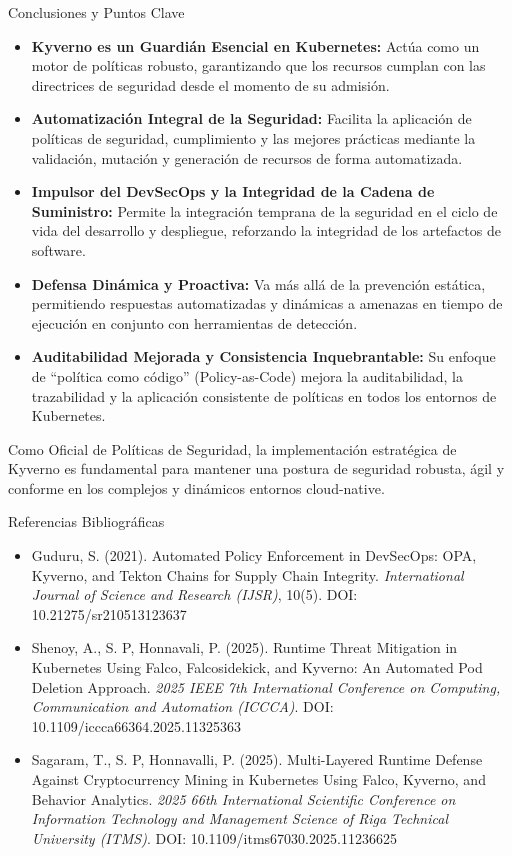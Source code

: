 \documentclass[aspectratio=169]{beamer}
\begin{document}
\begin{frame}{Conclusiones y Puntos Clave}


\begin{itemize}
  \item \textbf{Kyverno es un Guardián Esencial en Kubernetes:} Actúa como un motor de políticas robusto, garantizando que los recursos cumplan con las directrices de seguridad desde el momento de su admisión.
  \item \textbf{Automatización Integral de la Seguridad:} Facilita la aplicación de políticas de seguridad, cumplimiento y las mejores prácticas mediante la validación, mutación y generación de recursos de forma automatizada.
  \item \textbf{Impulsor del DevSecOps y la Integridad de la Cadena de Suministro:} Permite la integración temprana de la seguridad en el ciclo de vida del desarrollo y despliegue, reforzando la integridad de los artefactos de software.
  \item \textbf{Defensa Dinámica y Proactiva:} Va más allá de la prevención estática, permitiendo respuestas automatizadas y dinámicas a amenazas en tiempo de ejecución en conjunto con herramientas de detección.
  \item \textbf{Auditabilidad Mejorada y Consistencia Inquebrantable:} Su enfoque de ``política como código'' (Policy-as-Code) mejora la auditabilidad, la trazabilidad y la aplicación consistente de políticas en todos los entornos de Kubernetes.
\end{itemize}
Como Oficial de Políticas de Seguridad, la implementación estratégica de Kyverno es fundamental para mantener una postura de seguridad robusta, ágil y conforme en los complejos y dinámicos entornos cloud-native.

\end{frame}

\begin{frame}{Referencias Bibliográficas}


\begin{itemize}
  \item Guduru, S. (2021). Automated Policy Enforcement in DevSecOps: OPA, Kyverno, and Tekton Chains for Supply Chain Integrity. \textit{International Journal of Science and Research (IJSR)}, 10(5). DOI: 10.21275/sr210513123637
  \item Shenoy, A., S. P, Honnavali, P. (2025). Runtime Threat Mitigation in Kubernetes Using Falco, Falcosidekick, and Kyverno: An Automated Pod Deletion Approach. \textit{2025 IEEE 7th International Conference on Computing, Communication and Automation (ICCCA)}. DOI: 10.1109/iccca66364.2025.11325363
  \item Sagaram, T., S. P, Honnavalli, P. (2025). Multi-Layered Runtime Defense Against Cryptocurrency Mining in Kubernetes Using Falco, Kyverno, and Behavior Analytics. \textit{2025 66th International Scientific Conference on Information Technology and Management Science of Riga Technical University (ITMS)}. DOI: 10.1109/itms67030.2025.11236625
\end{itemize}
\end{frame}
\end{document}
